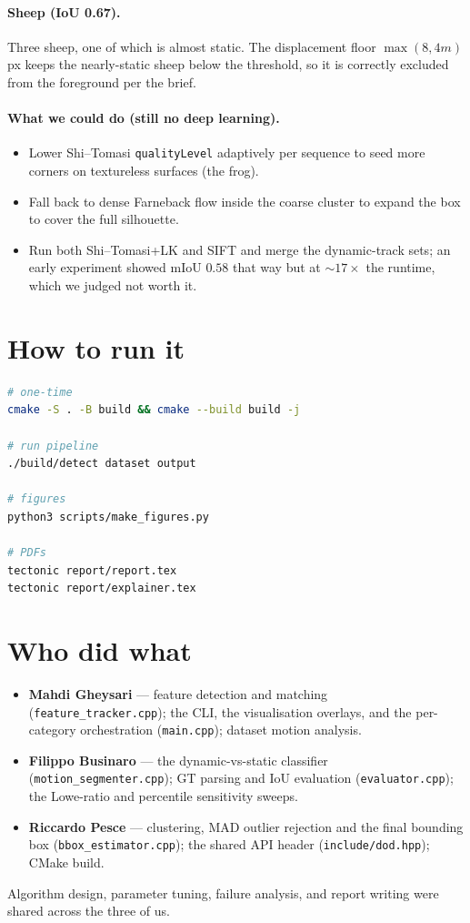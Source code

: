 \documentclass[11pt,a4paper]{article}
\begin{document}
\paragraph{Sheep (IoU 0.67).} Three sheep, one of which is almost
static. The displacement floor $\max(8, 4m)$\,px keeps the
nearly-static sheep below the threshold, so it is correctly
excluded from the foreground per the brief.

\paragraph{What we could do (still no deep learning).}
\begin{itemize}\itemsep2pt
\item Lower Shi--Tomasi \texttt{qualityLevel} adaptively per
  sequence to seed more corners on textureless surfaces (the frog).
\item Fall back to dense Farneback flow inside the coarse cluster
  to expand the box to cover the full silhouette.
\item Run both Shi--Tomasi+LK and SIFT and merge the dynamic-track
  sets; an early experiment showed mIoU $0.58$ that way but at
  $\sim 17\times$ the runtime, which we judged not worth it.
\end{itemize}

\section{How to run it}

\begin{lstlisting}[language=bash, caption={Build, run, regenerate figures, build PDFs.}]
# one-time
cmake -S . -B build && cmake --build build -j

# run pipeline
./build/detect dataset output

# figures
python3 scripts/make_figures.py

# PDFs
tectonic report/report.tex
tectonic report/explainer.tex
\end{lstlisting}

\section{Who did what}

\begin{itemize}\itemsep2pt
\item \textbf{Mahdi Gheysari} --- feature detection and matching
  (\texttt{feature\_tracker.cpp}); the CLI, the visualisation
  overlays, and the per-category orchestration (\texttt{main.cpp});
  dataset motion analysis.
\item \textbf{Filippo Businaro} --- the dynamic-vs-static classifier
  (\texttt{motion\_segmenter.cpp}); GT parsing and IoU evaluation
  (\texttt{evaluator.cpp}); the Lowe-ratio and percentile
  sensitivity sweeps.
\item \textbf{Riccardo Pesce} --- clustering, MAD outlier rejection
  and the final bounding box (\texttt{bbox\_estimator.cpp}); the
  shared API header (\texttt{include/dod.hpp}); CMake build.
\end{itemize}

Algorithm design, parameter tuning, failure analysis, and report
writing were shared across the three of us.
\end{document}
